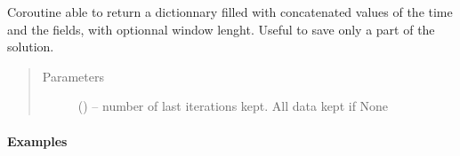 \documentclass[letterpaper,10pt,english]{sphinxmanual}
\begin{document}
\begin{fulllineitems}
\begin{description}
\end{description}

\end{fulllineitems}


\begin{fulllineitems}
\label{\detokenize{triflow.plugins:triflow.plugins.displays.window_data}}
Coroutine able to return a dictionnary filled with concatenated values
of the time and the fields, with optionnal window lenght. Useful to save
only a part of the solution.
\begin{quote}\begin{description}
\item[{Parameters}] \leavevmode
{} (\sphinxstyleliteralemphasis{ (}\sphinxstyleliteralemphasis{)}\sphinxstyleliteralemphasis{}) -- number of last iterations kept. All data kept if None

\end{description}\end{quote}
\paragraph{Examples}

\begin{sphinxVerbatim}[commandchars=\\\{\}]
     
   
\end{sphinxVerbatim}

\begin{sphinxVerbatim}[commandchars=\\\{\}]
   
  
\end{sphinxVerbatim}


\end{fulllineitems}
\end{document}
